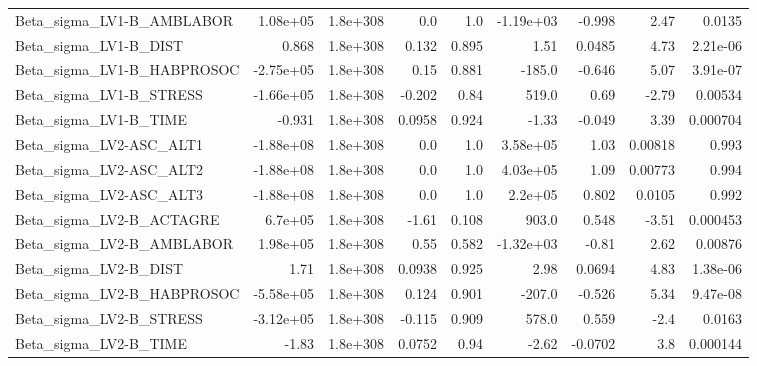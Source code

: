 \begin{tabular}{lrrrrrrrr}
Beta\_sigma\_LV1-B\_AMBLABOR         &    1.08e+05 &     1.8e+308 &     0.0 &      1.0 &  -1.19e+03 &      -0.998 &         2.47 &        0.0135 \\
Beta\_sigma\_LV1-B\_DIST             &       0.868 &     1.8e+308 &   0.132 &    0.895 &       1.51 &      0.0485 &         4.73 &      2.21e-06 \\
Beta\_sigma\_LV1-B\_HABPROSOC        &   -2.75e+05 &     1.8e+308 &    0.15 &    0.881 &     -185.0 &      -0.646 &         5.07 &      3.91e-07 \\
Beta\_sigma\_LV1-B\_STRESS           &   -1.66e+05 &     1.8e+308 &  -0.202 &     0.84 &      519.0 &        0.69 &        -2.79 &       0.00534 \\
Beta\_sigma\_LV1-B\_TIME             &      -0.931 &     1.8e+308 &  0.0958 &    0.924 &      -1.33 &      -0.049 &         3.39 &      0.000704 \\
Beta\_sigma\_LV2-ASC\_ALT1           &   -1.88e+08 &     1.8e+308 &     0.0 &      1.0 &   3.58e+05 &        1.03 &      0.00818 &         0.993 \\
Beta\_sigma\_LV2-ASC\_ALT2           &   -1.88e+08 &     1.8e+308 &     0.0 &      1.0 &   4.03e+05 &        1.09 &      0.00773 &         0.994 \\
Beta\_sigma\_LV2-ASC\_ALT3           &   -1.88e+08 &     1.8e+308 &     0.0 &      1.0 &    2.2e+05 &       0.802 &       0.0105 &         0.992 \\
Beta\_sigma\_LV2-B\_ACTAGRE          &     6.7e+05 &     1.8e+308 &   -1.61 &    0.108 &      903.0 &       0.548 &        -3.51 &      0.000453 \\
Beta\_sigma\_LV2-B\_AMBLABOR         &    1.98e+05 &     1.8e+308 &    0.55 &    0.582 &  -1.32e+03 &       -0.81 &         2.62 &       0.00876 \\
Beta\_sigma\_LV2-B\_DIST             &        1.71 &     1.8e+308 &  0.0938 &    0.925 &       2.98 &      0.0694 &         4.83 &      1.38e-06 \\
Beta\_sigma\_LV2-B\_HABPROSOC        &   -5.58e+05 &     1.8e+308 &   0.124 &    0.901 &     -207.0 &      -0.526 &         5.34 &      9.47e-08 \\
Beta\_sigma\_LV2-B\_STRESS           &   -3.12e+05 &     1.8e+308 &  -0.115 &    0.909 &      578.0 &       0.559 &         -2.4 &        0.0163 \\
Beta\_sigma\_LV2-B\_TIME             &       -1.83 &     1.8e+308 &  0.0752 &     0.94 &      -2.62 &     -0.0702 &          3.8 &      0.000144 \\

\end{tabular}
